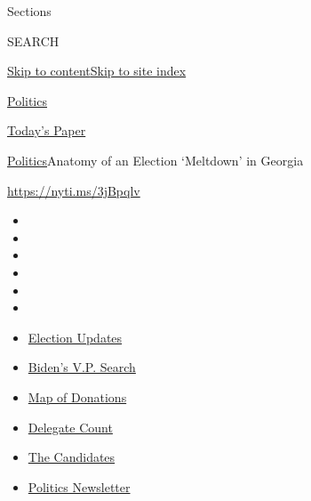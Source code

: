 Sections

SEARCH

\protect\hyperlink{site-content}{Skip to
content}\protect\hyperlink{site-index}{Skip to site index}

\href{https://www.nytimes.com/section/politics}{Politics}

\href{https://myaccount.nytimes.com/auth/login?response_type=cookie\&client_id=vi}{}

\href{https://www.nytimes.com/section/todayspaper}{Today's Paper}

\href{/section/politics}{Politics}\textbar{}Anatomy of an Election
`Meltdown' in Georgia

\url{https://nyti.ms/3jBpqlv}

\begin{itemize}
\item
\item
\item
\item
\item
\item
\end{itemize}

\begin{itemize}
\item
  \href{https://www.nytimes.com/2020/08/04/us/elections/primary-election-michigan-arizona-kansas.html?action=click\&pgtype=Article\&state=default\&region=TOP_BANNER\&context=storylines_menu}{Election
  Updates}
\item
  \href{https://www.nytimes.com/article/biden-vice-president-2020.html?action=click\&pgtype=Article\&state=default\&region=TOP_BANNER\&context=storylines_menu}{Biden's
  V.P. Search}
\item
  \href{https://www.nytimes.com/interactive/2020/07/24/us/politics/trump-biden-campaign-donors.html?action=click\&pgtype=Article\&state=default\&region=TOP_BANNER\&context=storylines_menu}{Map
  of Donations}
\item
  \href{https://www.nytimes.com/interactive/2020/us/elections/delegate-count-primary-results.html?action=click\&pgtype=Article\&state=default\&region=TOP_BANNER\&context=storylines_menu}{Delegate
  Count}
\item
  \href{https://www.nytimes.com/interactive/2019/us/politics/2020-presidential-candidates.html?action=click\&pgtype=Article\&state=default\&region=TOP_BANNER\&context=storylines_menu}{The
  Candidates}
\item
  \href{https://www.nytimes.com/newsletters/politics?action=click\&pgtype=Article\&state=default\&region=TOP_BANNER\&context=storylines_menu}{Politics
  Newsletter}
\end{itemize}

